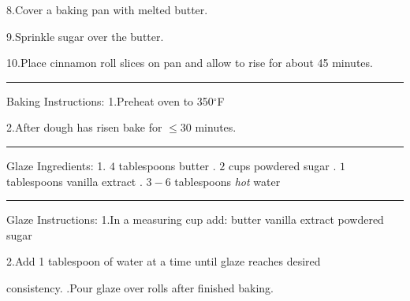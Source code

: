 \documentclass[12pt, letterpaper]{article}
\begin{document}
8.\hspace{0.3cm}Cover a baking pan with melted butter.

9.\hspace{0.3cm}Sprinkle sugar over the butter.

10.\hspace{0.1cm}Place cinnamon roll slices on pan and allow to rise for about 45 
\smallbreak
\hspace{0.6cm}minutes.

\break
\begin{center}\noindent\rule{15cm}{0.4pt}\end{center}
\large{Baking Instructions:}\bigbreak
\normalsize
1.\hspace{0.3cm}Preheat oven to 350$^\circ$F

2.\hspace{0.3cm}After dough has risen bake for  $\leq30$ minutes.


\begin{center}\noindent\rule{15cm}{0.4pt}\end{center}
\large{Glaze Ingredients:}\bigbreak
\normalsize
1.\hspace{0.3cm}  $4$ tablespoons butter
.\hspace{0.3cm}  $2$ cups powdered sugar
.\hspace{0.3cm}  $1$ tablespoons vanilla extract
.\hspace{0.3cm} $3-6$ tablespoons \textit{hot} water
\smallbreak
\begin{center}\noindent\rule{15cm}{0.4pt}\end{center}
\large{Glaze Instructions:}\bigbreak
\normalsize
1.\hspace{0.3cm}In a measuring cup add: \smallbreak
\hspace{0.6cm}butter\smallbreak
\hspace{0.6cm}vanilla extract\smallbreak
\hspace{0.6cm}powdered sugar\smallbreak
\smallbreak

2.\hspace{0.3cm}Add 1 tablespoon of water at a time until glaze reaches desired 

\hspace{0.6cm}consistency.
.\hspace{0.3cm}Pour glaze over rolls after finished baking.
\end{document}
